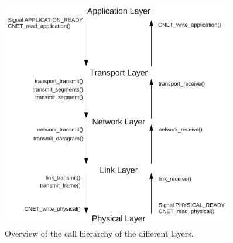 \begin{figure}
  \centering
  \includegraphics[width=0.9\textwidth]{images/flowgraph_overview.pdf}
  \caption[Overview Layers]{ Overview of the call hierarchy of the different layers.}
  \label{fig:overview-layers}
\end{figure}


